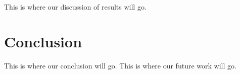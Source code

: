 \documentclass[11pt,a4paper]{article}
\begin{document}
This is where our discussion of results will go.



\section{Conclusion}
\label{sec:conclusion}


This is where our conclusion will go. This is where our future work will go. 











\end{document}
